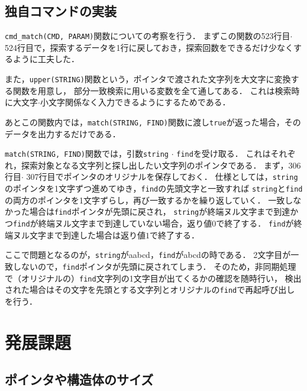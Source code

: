 \documentclass[autodetect-engine,dvi=dvipdfmx,ja=standard,
               a4j,11pt]{bxjsarticle}
\begin{document}
\subsection{独自コマンドの実装}

\verb|cmd_match(CMD, PARAM)|関数についての考察を行う．
まずこの関数の523行目$\cdot$ 524行目で，探索するデータを1行に戻しておき，探索回数をできるだけ少なくするように工夫した．

また，\verb|upper(STRING)|関数という，ポインタで渡された文字列を大文字に変換する関数を用意し，
部分一致検索に用いる変数を全て通してある．
これは検索時に大文字$\cdot$小文字関係なく入力できるようにするためである．

あとこの関数内では，\verb|match(STRING, FIND)|関数に渡し\verb|true|が返った場合，そのデータを出力するだけである．

\verb|match(STRING, FIND)|関数では，引数\verb|string| $\cdot$ \verb|find|を受け取る．
これはそれぞれ，探索対象となる文字列と探し出したい文字列のポインタである．
まず，306行目$\cdot$ 307行目でポインタのオリジナルを保存しておく．
仕様としては，\verb|string|のポインタを1文字ずつ進めてゆき，\verb|find|の先頭文字と一致すれば
\verb|string|と\verb|find|の両方のポインタを1文字ずらし，再び一致するかを繰り返していく．
一致しなかった場合は\verb|find|ポインタが先頭に戻され，
\verb|string|が終端ヌル文字まで到達かつ\verb|find|が終端ヌル文字まで到達していない場合，返り値$0$で終了する．
\verb|find|が終端ヌル文字まで到達した場合は返り値$1$で終了する．

ここで問題となるのが，\verb|string|がaabcd，\verb|find|がabcdの時である．
2文字目が一致しないので，\verb|find|ポインタが先頭に戻されてしまう．
そのため，非同期処理で（オリジナルの）\verb|find|文字列の1文字目が出てくるかの確認を随時行い，
検出された場合はその文字を先頭とする文字列とオリジナルの\verb|find|で再起呼び出しを行う．


\section{発展課題} \label{sec:6}

\subsection{ポインタや構造体のサイズ}
\end{document}
